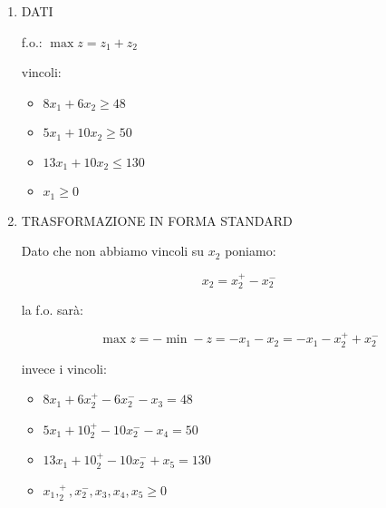 \begin{enumerate}
	\item DATI
	
		f.o.: $\max z = z_1 + z_2$

		vincoli:

		\begin{itemize}
			\item $8x_1 + 6x_2 \geq 48$
			\item $5x_1 + 10x_2 \geq 50$
			\item $13x_1 + 10x_2 \leq 130$
			\item $x_1 \geq 0$
		\end{itemize}
		
	\item TRASFORMAZIONE IN FORMA STANDARD
	
		Dato che non abbiamo vincoli su $x_2$ poniamo:
		
		$$x_2 = x_2^+ - x_2^-$$
		
		la f.o. sarà:
		
		$$\max z = -\min -z = -x_1 -x_2 = -x_1 -x_2^+ + x_2^-$$
		
		invece i vincoli:
		
		\begin{itemize}
			\item $8x_1 + 6x_2^+ - 6x_2^- - x_3 = 48$
			\item $5x_1 + 10_2^+ - 10x_2^- - x_4 = 50$
			\item $13x_1 + 10_2^+ - 10x_2^- + x_5 = 130$
			\item $x_1, _2^+, x_2^-, x_3, x_4, x_5 \geq 0$
		\end{itemize}
	
\end{enumerate}

